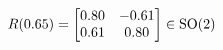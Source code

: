 \documentclass[preview]{standalone}
\begin{document}
\begin{align*}
\special{dvisvgm:raw <g id='unique000'>}R(0.65) = \begin{bmatrix} 0.80 & -0.61 \\ 0.61 & 0.80 \end{bmatrix} \in \text{SO}(2)\special{dvisvgm:raw </g>}
\end{align*}
\end{document}
